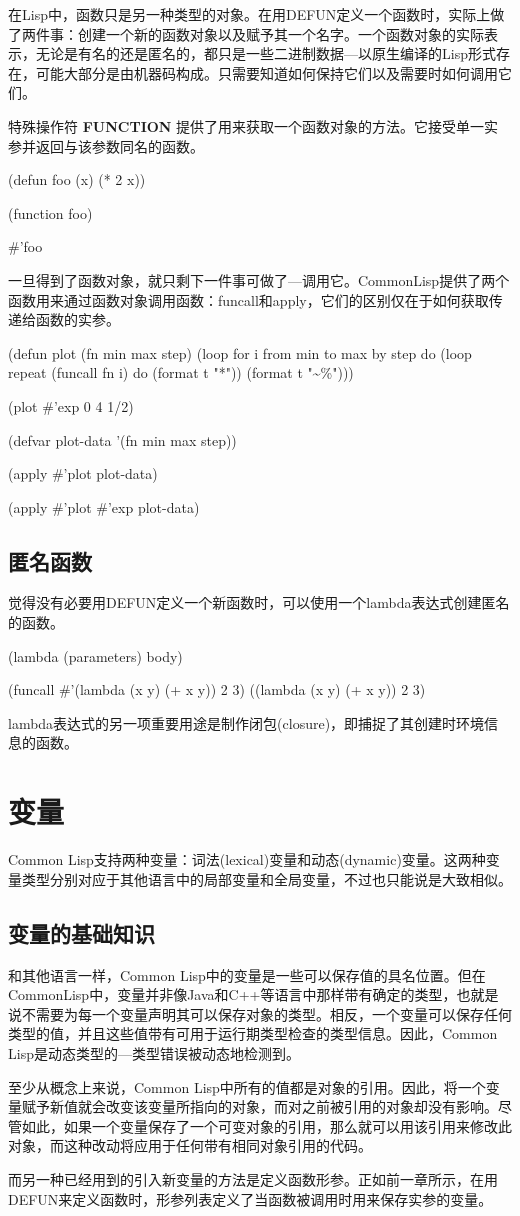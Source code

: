 \documentclass{ctexart}
\begin{document}
在Lisp中，函数只是另一种类型的对象。在用DEFUN定义一个函数时，实际上做了两件事：创建一个新的函数对象以及赋予其一个名字。一个函数对象的实际表示，无论是有名的还是匿名的，都只是一些二进制数据---以原生编译的Lisp形式存在，可能大部分是由机器码构成。只需要知道如何保持它们以及需要时如何调用它们。

特殊操作符 \textbf{FUNCTION} 提供了用来获取一个函数对象的方法。它接受单一实参并返回与该参数同名的函数。

(defun foo (x) (* 2 x))

(function foo)

\#'foo

一旦得到了函数对象，就只剩下一件事可做了---调用它。CommonLisp提供了两个函数用来通过函数对象调用函数：funcall和apply，它们的区别仅在于如何获取传递给函数的实参。

(defun plot (fn min max step)
  (loop for i from min to max by step do
    (loop repeat (funcall fn i) do (format t "*"))
    (format t "\textasciitilde{}\%")))

(plot \#'exp 0 4 1/2)

(defvar plot-data '(fn min max step))

(apply \#'plot plot-data)

(apply \#'plot \#'exp plot-data)

\subsection{匿名函数}
\label{sec-1-9}
觉得没有必要用DEFUN定义一个新函数时，可以使用一个lambda表达式创建匿名的函数。

(lambda (parameters) body)

(funcall \#'(lambda (x y) (+ x y)) 2 3)
((lambda (x y) (+ x y)) 2 3)

lambda表达式的另一项重要用途是制作闭包(closure)，即捕捉了其创建时环境信息的函数。

\section{变量}
\label{sec-2}
Common Lisp支持两种变量：词法(lexical)变量和动态(dynamic)变量。这两种变量类型分别对应于其他语言中的局部变量和全局变量，不过也只能说是大致相似。
\subsection{变量的基础知识}
\label{sec-2-1}
和其他语言一样，Common Lisp中的变量是一些可以保存值的具名位置。但在CommonLisp中，变量并非像Java和C++等语言中那样带有确定的类型，也就是说不需要为每一个变量声明其可以保存对象的类型。相反，一个变量可以保存任何类型的值，并且这些值带有可用于运行期类型检查的类型信息。因此，Common Lisp是动态类型的---类型错误被动态地检测到。

至少从概念上来说，Common Lisp中所有的值都是对象的引用。因此，将一个变量赋予新值就会改变该变量所指向的对象，而对之前被引用的对象却没有影响。尽管如此，如果一个变量保存了一个可变对象的引用，那么就可以用该引用来修改此对象，而这种改动将应用于任何带有相同对象引用的代码。

而另一种已经用到的引入新变量的方法是定义函数形参。正如前一章所示，在用DEFUN来定义函数时，形参列表定义了当函数被调用时用来保存实参的变量。
\end{document}
